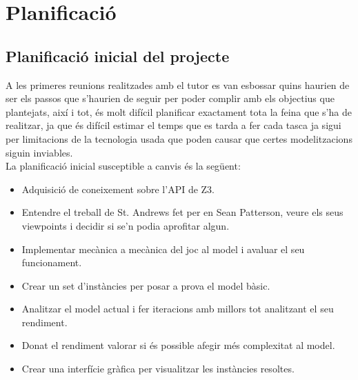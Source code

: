


\chapter{Planificació}

\label{Planificació}

\section{Planificació inicial del projecte}
A les primeres reunions realitzades amb el tutor es van esbossar quins haurien de ser els passos que s'haurien de seguir per poder complir amb els objectius que plantejats, així i tot, és molt difícil planificar exactament tota la feina que s'ha de realitzar, ja que és difícil estimar el temps que es tarda a fer cada tasca ja sigui per limitacions de la tecnologia usada que poden causar que certes modelitzacions siguin inviables.\\

La planificació inicial susceptible a canvis és la següent:

\begin{itemize}
    \item Adquisició de coneixement sobre l'API de Z3.
    \item Entendre el treball de St. Andrews fet per en Sean Patterson, veure els seus viewpoints i decidir si se'n podia aprofitar algun.
    \item Implementar mecànica a mecànica del joc al model i avaluar el seu funcionament.
    \item Crear un set d'instàncies per posar a prova el model bàsic.
    \item Analitzar el model actual i fer iteracions amb millors tot analitzant el seu rendiment.
    \item Donat el rendiment valorar si és possible afegir més complexitat al model.
    \item Crear una interfície gràfica per visualitzar les instàncies resoltes.
\end{itemize}

